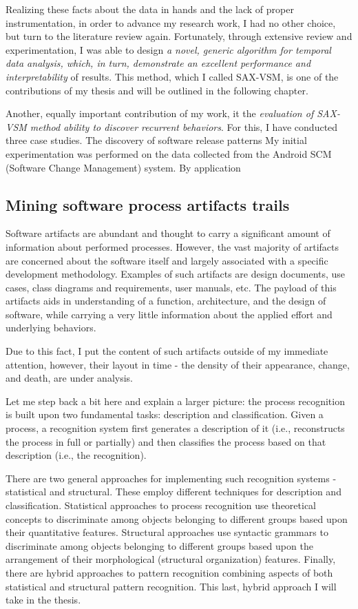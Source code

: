 \documentclass[11pt,oneside]{article}
\numberwithin{equation}{subsection}
\begin{document}
Realizing these facts about the data in hands and the lack of proper instrumentation, in order to
advance my research work, I had no other choice, but turn to the literature review
again. Fortunately, through extensive review and experimentation, I was able to design \textit{a
novel, generic algorithm for temporal data analysis, which, in turn, demonstrate an excellent
performance and interpretability} of results. This method, which I called SAX-VSM, is one of the
contributions of my thesis and will be outlined in the following chapter.

Another, equally important contribution of my work, it the \textit{evaluation of SAX-VSM method
ability to discover recurrent behaviors}. For this, I have conducted three case studies. The
discovery of software release patterns My initial experimentation was performed on the data
collected from the Android SCM (Software Change Management) system. By application 

\subsection{Mining software process artifacts trails}
Software artifacts are abundant and thought to carry a significant amount of information about
performed processes. However, the vast majority of artifacts are concerned about the software itself
and largely associated  with a specific development methodology. Examples of such artifacts are
design documents, use cases, class diagrams and requirements, user manuals, etc. The payload of this
artifacts aids in understanding of a function, architecture, and the design of software, while
carrying a very little information about the applied effort and underlying behaviors. 

Due to this fact, I put the content of such artifacts outside of my immediate attention,
however, their layout in time - the density of their appearance, change, and death, are under
analysis.

Let me step back a bit here and explain a larger picture: the process recognition is built upon two
fundamental tasks: description and classification. Given a process, a recognition system first
generates a description of it (i.e., reconstructs the process in full or partially) and then
classifies the process based on that description (i.e., the recognition).

There are two general approaches for implementing such recognition systems - statistical and
structural. These employ different techniques for description and classification. Statistical
approaches to process recognition use theoretical concepts to discriminate among objects belonging
to different groups based upon their quantitative features. Structural approaches use syntactic
grammars to discriminate among objects belonging to different groups based upon the arrangement of
their morphological (structural organization) features. Finally, there are hybrid approaches to
pattern recognition combining aspects of both statistical and structural pattern recognition. This
last, hybrid approach I will take in the thesis.
\end{document}
